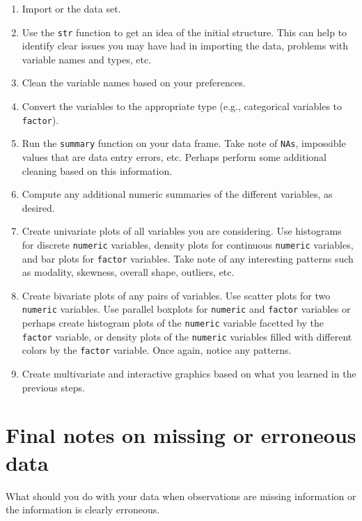 \documentclass[
]{book}
\providecommand{\tightlist}{%
  \setlength{\itemsep}{0pt}\setlength{\parskip}{0pt}}
\theoremstyle{definition}
\theoremstyle{definition}
\theoremstyle{definition}
\theoremstyle{definition}
\theoremstyle{remark}
\begin{document}
\begin{enumerate}
\def\labelenumi{\arabic{enumi}.}
\tightlist
\item
  Import or the data set.
\item
  Use the \texttt{str} function to get an idea of the initial structure. This can help to identify clear issues you may have had in importing the data, problems with variable names and types, etc.
\item
  Clean the variable names based on your preferences.
\item
  Convert the variables to the appropriate type (e.g., categorical variables to \texttt{factor}).
\item
  Run the \texttt{summary} function on your data frame. Take note of \texttt{NAs}, impossible values that are data entry errors, etc. Perhaps perform some additional cleaning based on this information.
\item
  Compute any additional numeric summaries of the different variables, as desired.
\item
  Create univariate plots of all variables you are considering. Use histograms for discrete \texttt{numeric} variables, density plots for continuous \texttt{numeric} variables, and bar plots for \texttt{factor} variables. Take note of any interesting patterns such as modality, skewness, overall shape, outliers, etc.
\item
  Create bivariate plots of any pairs of variables. Use scatter plots for two \texttt{numeric} variables. Use parallel boxplots for \texttt{numeric} and \texttt{factor} variables or perhaps create histogram plots of the \texttt{numeric} variable facetted by the \texttt{factor} variable, or density plots of the \texttt{numeric} variables filled with different colors by the \texttt{factor} variable. Once again, notice any patterns.
\item
  Create multivariate and interactive graphics based on what you learned in the previous steps.
\end{enumerate}

\hypertarget{final-notes-on-missing-or-erroneous-data}{%
\section{Final notes on missing or erroneous data}\label{final-notes-on-missing-or-erroneous-data}}

What should you do with your data when observations are missing information or the information is clearly erroneous.
\end{document}
